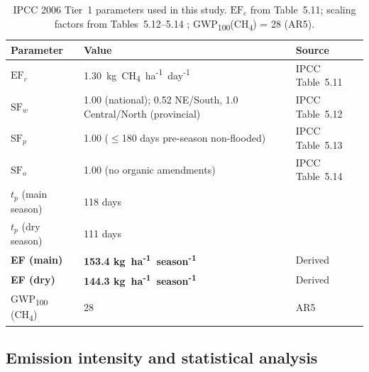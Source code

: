\documentclass[fleqn,10pt]{olplainarticle}
\begin{document}
\begin{table}[!htbp]
\centering
\caption{IPCC 2006 Tier~1 parameters used in this study.
         $\text{EF}_c$ from Table~5.11; scaling factors from Tables~5.12--5.14
         \citep{ipcc2006}; GWP\textsubscript{100}(CH\textsubscript{4}) = 28 (AR5).}
\label{tab:ef}
\begin{tabular}{@{}lll@{}}
\toprule
\textbf{Parameter} & \textbf{Value} & \textbf{Source} \\
\midrule
$\text{EF}_c$ & 1.30~kg~CH\textsubscript{4}~ha\textsuperscript{-1}~day\textsuperscript{-1} & IPCC Table~5.11 \\
$\text{SF}_w$ & 1.00 (national); 0.52 NE/South, 1.0 Central/North (provincial) & IPCC Table~5.12 \\
$\text{SF}_p$ & 1.00 ($\leq$180 days pre-season non-flooded) & IPCC Table~5.13 \\
$\text{SF}_o$ & 1.00 (no organic amendments) & IPCC Table~5.14 \\
\midrule
$t_p$ (main season)  & 118 days & \cite{buddhaboon2011} \\
$t_p$ (dry season)   & 111 days & \cite{buddhaboon2011} \\
\textbf{EF (main)} & \textbf{153.4 kg~ha\textsuperscript{-1}~season\textsuperscript{-1}} & Derived \\
\textbf{EF (dry)}  & \textbf{144.3 kg~ha\textsuperscript{-1}~season\textsuperscript{-1}} & Derived \\
GWP\textsubscript{100} (CH\textsubscript{4}) & 28 & AR5 \\
\bottomrule
\end{tabular}
\end{table}

\subsection*{Emission intensity and statistical analysis}
\end{document}
